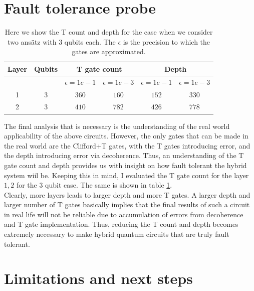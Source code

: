 \documentclass{article}
\begin{document}
\section{Fault tolerance probe}
\begin{table}
    \centering
    \begin{tabular}{|c|c|c|c|c|c|}
        \hline
        Layer & Qubits& \multicolumn{2}{c}{T gate count} & \multicolumn{2}{c}{Depth}  \\
        \hline & & $\epsilon =1e-1$ & $\epsilon =1e-3$ & $\epsilon =1e-1$ & $\epsilon =1e-3$\\ 
        \hline 
        1 & 3 & $360 $ & $160$ & $152$  & $330$ \\
        2 & 3 & $410$ & $782$ & $426$ & $778$ \\
        \hline
    \end{tabular}
    \caption{Here we show the T count and depth for the case when we consider two ans{\"a}tz with 3 qubits each. The $\epsilon$ is the precision to which the gates are approximated. }
    \label{tab:T_gates_count_table}
\end{table}

The final analysis that is necessary is the understanding of the real world applicability of the above circuits. However, the only gates that can be made in the real world are the Clifford+T gates, with the T gates introducing error, and the depth introducing error via decoherence. Thus, an understanding of the T gate count and depth provides us with insight on how fault tolerant the hybrid system wiil be.
Keeping this in mind, I evaluated the T gate count for the layer $1,2$ for the $3$ qubit case. The same is shown in table \ref{tab:T_gates_count_table}.\\
Clearly, more layers leads to larger depth and more T gates. A larger depth and larger number of T gates basically implies that the final results of such a circuit in real life will not be reliable due to accumulation of errors from decoherence and T gate implementation. Thus, reducing the T count and depth becomes extremely necessary to make hybrid quantum circuits that are truly fault tolerant. 


\section{Limitations and next steps}
\end{document}
